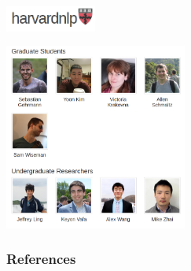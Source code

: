 \documentclass{beamer}
\newcommand{\air}{\vspace{0.25cm}}
\begin{document}


\begin{frame}
  \begin{center} 
  \end{center}
  \air 
  \begin{center}
    \includegraphics[width=3cm]{harvardnlp}
  \end{center}

  \begin{center}
    \includegraphics[width=6cm]{harvardnlpgroup}
  \end{center}
  
\end{frame}



\begin{frame}[t,allowframebreaks]
  \frametitle{References}
  \begin{small}
    
  \end{small}
 \end{frame}


\end{document}
